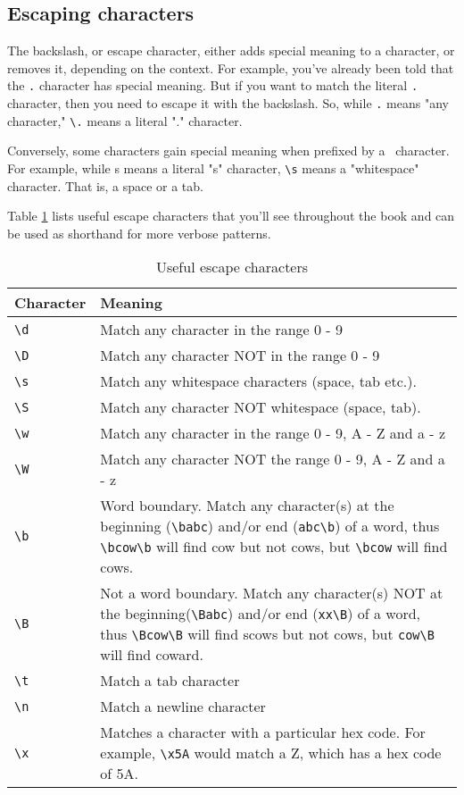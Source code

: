 \subsection{Escaping characters}

The backslash, or escape character, either adds special meaning to a character, or removes it, 
depending on the context. For example, you've already been told that the \verb=.= character has 
special meaning. But if you want to match the literal \verb=.= character, then you need to escape it 
with the backslash. So, while \verb=.= means "any character," \verb=\.= means a literal "." character.

Conversely, some characters gain special meaning when prefixed by a \ character. For 
example, while s means a literal "s" character, \verb=\s= means a "whitespace" character. That is, a 
space or a tab.

Table \ref{metachar_table} lists useful escape characters that you'll
see throughout the book and can be used as shorthand for more
verbose patterns.

\begin{table}[ht]
\caption{Useful escape characters}
\label{metachar_table}
\begin{tabular}{l | p{12cm}}
Character & Meaning\\ \hline \hline
\verb#\d# & Match any character in the range 0 - 9\\ \hline
\verb#\D# & Match any character NOT in the range 0 - 9\\ \hline
\verb#\s# & Match any whitespace characters (space, tab etc.).\\ \hline
\verb#\S# & Match any character NOT whitespace (space, tab).\\ \hline
\verb#\w# & Match any character in the range 0 - 9, A - Z and a - z\\ \hline
\verb#\W# & Match any character NOT the range 0 - 9, A - Z and a - z\\ \hline
\verb#\b# & Word boundary. Match any character(s) at the beginning (\verb#\babc#) and/or
end (\verb#abc\b#) of a word, thus \verb#\bcow\b# will find cow but not cows, but \verb#\bcow#
will find cows. \\ \hline
\verb#\B# & Not a word boundary. Match any character(s) NOT at the beginning(\verb#\Babc#)
and/or end (\verb#xx\B#) of a word, thus \verb#\Bcow\B# will find scows but not
cows, but \verb#cow\B# will find coward.\\ \hline
\verb=\t= & Match a tab character \\ \hline
\verb=\n= & Match a newline character \\ \hline
\verb=\x= & Matches a character with a particular hex code. For example,
\verb=\x5A= would match a Z, which has a hex code of 5A.\\ \hline
\end{tabular}
\end{table}

